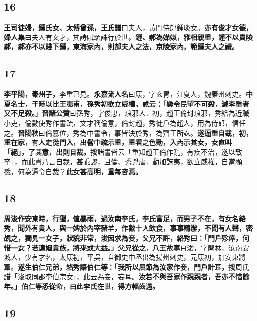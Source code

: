 \subsection*{16}

\textbf{王司徒婦，鍾氏女、太傅曾孫，}{\footnotesize \textbf{王氏譜}曰夫人，黃門侍郎鍾琰女。}\textbf{亦有俊才女德，}{\footnotesize \textbf{婦人集}曰夫人有文才，其詩賦頌誄行於世。}\textbf{鍾、郝為娣姒，雅相親重，鍾不以貴陵郝，郝亦不以賤下鍾，東海家內，則郝夫人之法，京陵家內，範鍾夫人之禮。}

\subsection*{17}

\textbf{李平陽，秦州子，}{\footnotesize 李重已見。\textbf{永嘉流人名}曰康，字玄冑，江夏人，魏秦州刺史。}\textbf{中夏名士，于時以比王夷甫，孫秀初欲立威權，咸云：「樂令民望不可殺，減李重者又不足殺。」}{\footnotesize \textbf{晉諸公贊}曰孫秀，字俊忠，琅邪人，初，趙王倫封琅邪，秀給為近職小吏，倫數使秀作書疏，文才稱倫意，倫封趙，秀徙戶為趙人，用為侍郎，信任之。\textbf{晉陽秋}曰倫篡位，秀為中書令，事皆決於秀，為齊王所誅。}\textbf{遂逼重自裁，初，重在家，有人走從門入，出髻中疏示重，重看之色動，入內示其女，女直叫「絕」，了其意，出則自裁。}{\footnotesize \textbf{按}諸書皆云「重知趙王倫作亂，有疾不治，遂以致卒」，而此書乃言自裁，甚乖謬，且倫、秀兇虐，動加誅夷，欲立威權，自當顯戮，何為逼令自裁？}\textbf{此女甚高明，重每咨焉。}

\subsection*{18}

\textbf{周浚作安東時，行獵，值暴雨，過汝南李氏，李氏富足，而男子不在，有女名絡秀，聞外有貴人，與一婢於內宰豬羊，作數十人飲食，事事精辦，不聞有人聲，密覘之，獨見一女子，狀貌非常，浚因求為妾，父兄不許，絡秀曰：「門戶殄瘁，何惜一女？若連姻貴族，將來或大益。」父兄從之，}{\footnotesize \textbf{八王故事}曰浚，字開林，汝南安城人，少有才名，太康初，平吳，自御史中丞出為揚州刺史，元康初，加安東將軍。}\textbf{遂生伯仁兄弟，絡秀語伯仁等：「我所以屈節為汝家作妾，門戶計耳，}{\footnotesize \textbf{按}周氏譜「浚取同郡李伯宗女」，此云為妾，妄耳。}\textbf{汝若不與吾家作親親者，吾亦不惜餘年。」伯仁等悉從命，由此李氏在世，得方幅齒遇。}

\subsection*{19}

